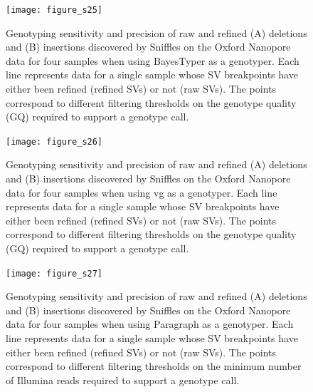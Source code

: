\documentclass[12pt]{article}
\newenvironment{lsfigure}
	{\begin{landscape} \begin{figure} \centering}
	{\end{figure} \end{landscape}}
\begin{document}
\clearpage%

\begin{lsfigure}
	\texttt{[image: figure\_s25]}

	\caption[Genotyping sensitivity of raw and refined Oxford Nanopore SVs for four samples using BayesTyper]{
		Genotyping sensitivity and precision of raw and refined (A) deletions and (B) insertions discovered by Sniffles on the Oxford Nanopore data for four samples when using BayesTyper as a genotyper.
		Each line represents data for a single sample whose SV breakpoints have either been refined (refined SVs) or not (raw SVs).
		The points correspond to different filtering thresholds on the genotype quality (GQ) required to support a genotype call.
	}

	\label{fig_s25}

\end{lsfigure}

\clearpage%

\begin{lsfigure}
	\texttt{[image: figure\_s26]}

	\caption[Genotyping sensitivity of raw and refined Oxford Nanopore SVs for four samples using vg]{
		Genotyping sensitivity and precision of raw and refined (A) deletions and (B) insertions discovered by Sniffles on the Oxford Nanopore data for four samples when using vg as a genotyper.
		Each line represents data for a single sample whose SV breakpoints have either been refined (refined SVs) or not (raw SVs).
		The points correspond to different filtering thresholds on the genotype quality (GQ) required to support a genotype call.
	}

	\label{fig_s26}

\end{lsfigure}

\clearpage%

\begin{lsfigure}
	\texttt{[image: figure\_s27]}

	\caption[Genotyping sensitivity of raw and refined Oxford Nanopore SVs for four samples using Paragraph]{
		Genotyping sensitivity and precision of raw and refined (A) deletions and (B) insertions discovered by Sniffles on the Oxford Nanopore data for four samples when using Paragraph as a genotyper.
		Each line represents data for a single sample whose SV breakpoints have either been refined (refined SVs) or not (raw SVs).
		The points correspond to different filtering thresholds on the minimum number of Illumina reads required to support a genotype call.
	}

	\label{fig_s27}

\end{lsfigure}

\clearpage%



\end{document}
